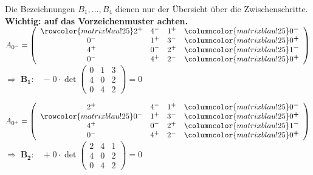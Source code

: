 \documentclass[a4paper,11pt,oneside,open=any,parskip=half, DIV=15]{scrreprt}
\begin{document}
\begin{enumerate}
               Die Bezeichnungen \(B_{1},\dots,B_{4}\) dienen nur der Übersicht über die Zwischenschritte.\\
               \textbf{Wichtig: auf das Vorzeichenmuster achten.}\\[1em]
               \(
                  A_{0^{-}}=
                        \left(
                           \begin{array}{c c c >{\columncolor{matrixblau!25}}c}
                              \rowcolor{matrixblau!25}
                              2^{+} & 4^{-} & 1^{+} & 0^{\boldsymbol{-}}\\
                              0^{-} & 1^{+} & 3^{-} & 0^{\boldsymbol{+}}\\
                              4^{+} & 0^{-} & 2^{+} & 1^{\boldsymbol{-}}\\
                              0^{-} & 4^{+} & 2^{-} & 0^{\boldsymbol{+}}
                           \end{array}
                        \right)
               \) \quad \(\Rightarrow \; \mathbf{B_{1}:} \quad \boldsymbol{-} \; 0 \cdot \det\begin{pmatrix}0&1&3\\4&0&2\\0&4&2\end{pmatrix} = 0\)

               \vspace{1em}
            
               \(
                  A_{0^{+}}=
                        \left(
                           \begin{array}{c c c >{\columncolor{matrixblau!25}}c}
                              2^{+} & 4^{-} & 1^{+} & 0^{\boldsymbol{-}}\\
                              \rowcolor{matrixblau!25}
                              0^{-} & 1^{+} & 3^{-} & 0^{\boldsymbol{+}}\\
                              4^{+} & 0^{-} & 2^{+} & 1^{\boldsymbol{-}}\\
                              0^{-} & 4^{+} & 2^{-} & 0^{\boldsymbol{+}}
                           \end{array}
                        \right)
               \) \quad \(\Rightarrow \; \mathbf{B_{2}:} \quad \boldsymbol{+} \; 0 \cdot \det\begin{pmatrix}2&4&1\\4&0&2\\0&4&2\end{pmatrix} = 0\)
               

\end{enumerate}
\end{document}
